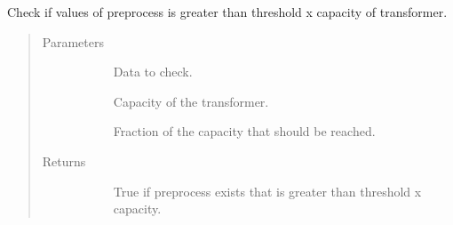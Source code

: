 \documentclass[letterpaper,10pt,english]{sphinxmanual}
\begin{document}

\begin{fulllineitems}
\label{\detokenize{autoapi/src/preprocess/preprocess/index:src.preprocess.preprocess.too_small}}
Check if values of preprocess is greater than threshold x capacity of transformer.
\begin{quote}\begin{description}
\item[{Parameters}] \leavevmode\begin{description}
\item[{}] \leavevmode
Data to check.

\item[{}] \leavevmode
Capacity of the transformer.

\item[{}] \leavevmode
Fraction of the capacity that should be reached.

\end{description}

\item[{Returns}] \leavevmode\begin{description}
\item[{}] \leavevmode
True if preprocess exists that is greater than threshold x capacity.

\end{description}

\end{description}\end{quote}

\end{fulllineitems}

\end{document}
